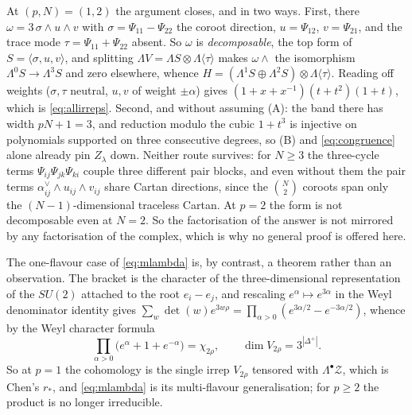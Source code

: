 \documentclass[10pt]{article}
\begin{document}
At $(p,N)=(1,2)$ the argument closes, and in two ways. First, there $\omega=3\,\sigma\wedge u\wedge v$ with $\sigma=\Psi_{11}-\Psi_{22}$ the coroot direction,
$u=\Psi_{12}$, $v=\Psi_{21}$, and the trace mode $\tau=\Psi_{11}+\Psi_{22}$ absent. So $\omega$ is
\emph{decomposable}, the top form of $S=\langle\sigma,u,v\rangle$, and splitting
$\Lambda V=\Lambda S\otimes\Lambda\langle\tau\rangle$ makes $\omega\wedge$ the isomorphism
$\Lambda^0S\to\Lambda^3S$ and zero elsewhere, whence $H=(\Lambda^1S\oplus\Lambda^2S)\otimes\Lambda\langle\tau\rangle$.
Reading off weights ($\sigma,\tau$ neutral, $u,v$ of weight $\pm\alpha$) gives
$(1+x+x^{-1})(t+t^2)(1+t)$, which is \eqref{eq:allirreps}. Second, and without assuming (A): the band there has
width $pN+1=3$, and reduction modulo the cubic $1+t^3$ is injective on polynomials supported on three
consecutive degrees, so (B) and \eqref{eq:congruence} alone already pin $Z_\lambda$ down. Neither route
survives: for $N\ge3$ the
three-cycle terms $\Psi_{ij}\Psi_{jk}\Psi_{ki}$ couple three different pair blocks, and even without them the
pair terms $\alpha^\vee_{ij}\wedge u_{ij}\wedge v_{ij}$ share Cartan directions, since the $\binom N2$ coroots
span only the $(N-1)$-dimensional traceless Cartan. At $p=2$ the form is not decomposable even at $N=2$. So the
factorisation of the answer is not mirrored by any factorisation of the complex, which is why no general proof
is offered here.

The one-flavour case of \eqref{eq:mlambda} is, by contrast, a theorem rather than an observation. The bracket is the character
of the three-dimensional representation of the $SU(2)$ attached to the root $e_i-e_j$, and rescaling
$e^\alpha\mapsto e^{3\alpha}$ in the Weyl denominator identity gives
$\sum_w\det(w)e^{3w\rho}=\prod_{\alpha>0}(e^{3\alpha/2}-e^{-3\alpha/2})$, whence by the Weyl character formula
\begin{equation}
\prod_{\alpha>0}\big(e^{\alpha}+1+e^{-\alpha}\big)=\chi_{2\rho},
\qquad \dim V_{2\rho}=3^{|\Delta^+|}.
\end{equation}
So at $p=1$ the cohomology is the single irrep $V_{2\rho}$ tensored with $\Lambda^\bullet\mathcal Z$, which is
Chen's $r_*$, and \eqref{eq:mlambda} is its multi-flavour generalisation; for $p\ge2$ the product is no longer
irreducible.
\end{document}
